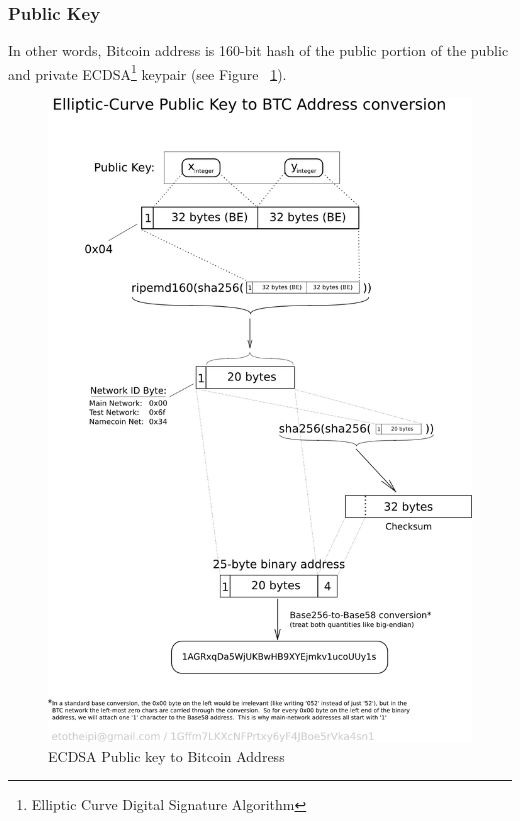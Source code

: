 \subsubsection{Public Key}
 In other words, Bitcoin address is 160-bit hash of the public portion of the public and private ECDSA\footnote{Elliptic Curve Digital Signature Algorithm} keypair (see Figure ~\ref{fig:pubkeytoaddr}).

\begin{figure}
\centering
\includegraphics[scale=1]{fig/PubKeyToAddr.png}
  \caption{ECDSA Public key to Bitcoin Address}
\label{fig:pubkeytoaddr}
\end{figure}


